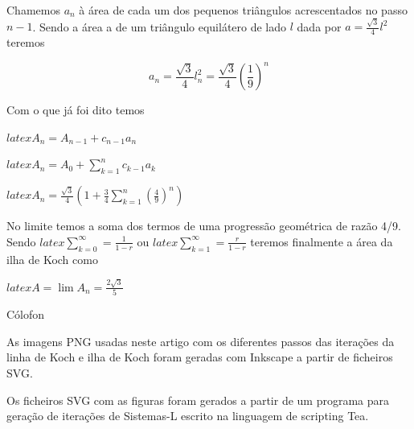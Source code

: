 \documentclass[11pt]{article}
\begin{document}
Chamemos $a_n$ à área de cada um dos pequenos triângulos acrescentados
no passo $n-1$. Sendo a área a de um triângulo equilátero de lado $l$ dada
por $a=\frac{\sqrt{3}}{4}l^2$ teremos

\[
a_n = \frac{\sqrt{3}}{4} l_n^2 = \frac{\sqrt{3}}{4} \left(\frac{1}{9}\right)^n
\]

Com o que já foi dito temos

$latex \displaystyle A_n = A_{n-1} + c_{n-1}a_n $

$latex \displaystyle A_n = A_0 + \sum_{k=1}^n c_{k-1}a_k $

$latex \displaystyle A_n = \frac{\sqrt{3}}{4} \left( 1 + \frac{3}{4} \sum_{k=1}^n \left(\frac{4}{9}\right)^n \right)$

No limite temos a soma dos termos de uma progressão geométrica de razão 4/9. Sendo $latex \sum_{k=0}^\infty = \frac{1}{1-r}$ ou $latex \sum_{k=1}^\infty = \frac{r}{1-r}$ teremos finalmente a área da ilha de Koch como

$latex \displaystyle A = \lim A_n = \frac{2\sqrt{3}}{5} $

Cólofon

As imagens PNG usadas neste artigo com os diferentes passos das iterações da linha de Koch e ilha de Koch foram geradas com Inkscape a partir de ficheiros SVG.

Os ficheiros SVG com as figuras foram gerados a partir de um programa para geração de iterações de Sistemas-L escrito na linguagem de scripting Tea.

  




  
\end{document}
